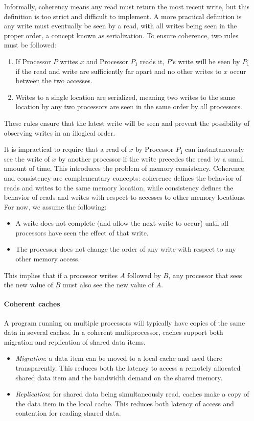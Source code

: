 Informally, coherency means any read must return the most recent write, but this definition is too strict and difficult to implement.
A more practical definition is any write must eventually be seen by a read, with all writes being seen in the proper order, a concept known as serialization. 
To ensure coherence, two rules must be followed:
\begin{enumerate}
    \item If Processor $P$ writes $x$ and Processor $P_1$ reads it, $P$'s write will be seen by $P_1$ if the read and write are sufficiently far apart and no other writes to $x$ occur between the two accesses.
    \item Writes to a single location are serialized, meaning two writes to the same location by any two processors are seen in the same order by all processors.
\end{enumerate}
These rules ensure that the latest write will be seen and prevent the possibility of observing writes in an illogical order.

It is impractical to require that a read of $x$ by Processor $P_1$ can instantaneously see the write of $x$ by another processor if the write precedes the read by a small amount of time. 
This introduces the problem of memory consistency. 
Coherence and consistency are complementary concepts: coherence defines the behavior of reads and writes to the same memory location, while consistency defines the behavior of reads and writes with respect to accesses to other memory locations.
For now, we assume the following:
\begin{itemize}
    \item A write does not complete (and allow the next write to occur) until all processors have seen the effect of that write.
    \item The processor does not change the order of any write with respect to any other memory access.
\end{itemize}
This implies that if a processor writes $A$ followed by $B$, any processor that sees the new value of $B$ must also see the new value of $A$.

\paragraph*{Coherent caches}
A program running on multiple processors will typically have copies of the same data in several caches. 
In a coherent multiprocessor, caches support both migration and replication of shared data items.
\begin{itemize}
    \item \textit{Migration}: a data item can be moved to a local cache and used there transparently. 
        This reduces both the latency to access a remotely allocated shared data item and the bandwidth demand on the shared memory.
    \item \textit{Replication}: for shared data being simultaneously read, caches make a copy of the data item in the local cache. This reduces both latency of access and contention for reading shared data.
\end{itemize}

